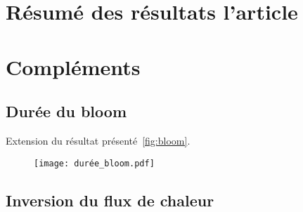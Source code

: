 
\label{chp:res-phenologie}
\graphicspath{{resources/res_phenologie}}

\minitoc%
\clearpage

\section{Résumé des résultats l'article}
\label{sec:resume-res-phenologie}

\section{Compléments}
\label{sec:complements-phenologie}

\subsection{Durée du bloom}
\label{sec:duree-bloom}

Extension du résultat présenté~\cref{fig:bloom}.

\begin{figure}
  \centering
  \texttt{[image: durée\_bloom.pdf]}
  \label{fig:duree-bloom}
\end{figure}

\subsection{Inversion du flux de chaleur}
\label{sec:flux-chaleur}
